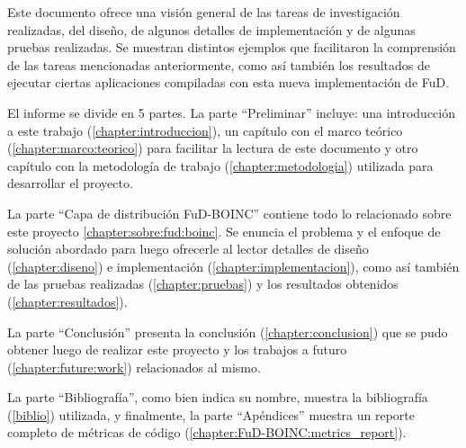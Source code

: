 Este documento ofrece una visión general de las tareas de investigación realizadas, del diseño, de algunos detalles de implementación y de algunas pruebas realizadas. Se muestran distintos ejemplos que facilitaron la comprensión de las tareas mencionadas anteriormente, como así también los resultados de ejecutar ciertas aplicaciones compiladas con esta nueva implementación de FuD.

El informe se divide en 5 partes. La parte  “Preliminar” incluye: una introducción a este trabajo (\ref{chapter:introduccion}), un capítulo con el marco teórico (\ref{chapter:marco:teorico}) para facilitar la lectura de este documento y otro capítulo con la metodología de trabajo (\ref{chapter:metodologia}) utilizada para desarrollar el proyecto.
	 	 	
La parte “Capa de distribución FuD-BOINC” contiene todo lo relacionado sobre este proyecto \ref{chapter:sobre:fud:boinc}. Se enuncia el problema y el enfoque de solución abordado para luego ofrecerle al lector detalles de diseño (\ref{chapter:diseno}) e implementación (\ref{chapter:implementacion}), como así también de las pruebas realizadas (\ref{chapter:pruebas}) y los resultados obtenidos (\ref{chapter:resultados}).

La parte “Conclusión” presenta la conclusión (\ref{chapter:conclusion}) que se pudo obtener luego de realizar este proyecto y los trabajos a futuro (\ref{chapter:future:work}) relacionados al mismo.

La parte “Bibliografía”, como bien indica su nombre, muestra la bibliografía (\ref{biblio}) utilizada, y finalmente, la parte “Apéndices” muestra un reporte completo de métricas de código (\ref{chapter:FuD-BOINC:metrics_report}).